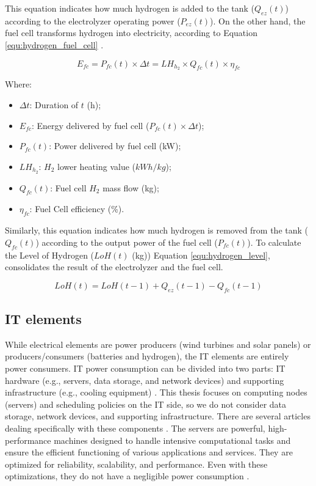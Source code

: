 This equation indicates how much hydrogen is added to the tank ($Q_{ez}(t)$) according to the electrolyzer operating power ($P_{ez}(t)$). On the other hand, the fuel cell transforms hydrogen into electricity, according to Equation \ref{equ:hydrogen_fuel_cell} \cite{haddad2019mixed}.

\begin{equation}
    \label{equ:hydrogen_fuel_cell}
    E_{fc} = P_{fc}(t) \times \Delta t = LH_{h_{2}} \times Q_{fc}(t) \times \eta_{fc}
\end{equation}

Where:
\begin{itemize}
    \item $\Delta t$: Duration of $t$ (h);
    \item $E_{fc}$: Energy delivered by fuel cell ($P_{fc}(t) \times \Delta t$);
    \item $P_{fc}(t)$: Power delivered by fuel cell (kW);
    \item $LH_{h_{2}}$: $H_2$ lower heating value ($kWh / kg$);
    \item $Q_{fc}(t)$: Fuel cell $H_2$ mass flow (kg);
    \item $\eta_{fc}$: Fuel Cell efficiency (\%).
\end{itemize}

Similarly, this equation indicates how much hydrogen is removed from the tank ($Q_{fc}(t)$) according to the output power of the fuel cell ($P_{fc}(t)$). To calculate the Level of Hydrogen ($LoH(t)$ (kg)) Equation \ref{equ:hydrogen_level}, consolidates the result of the electrolyzer and the fuel cell.

\begin{equation}
    \label{equ:hydrogen_level}
    LoH(t) = LoH(t-1) + Q_{ez}(t-1) - Q_{fc}(t-1)
\end{equation}

\subsection{IT elements}
\label{sec:related_work_it_elements}
While electrical elements are power producers (wind turbines and solar panels) or producers/consumers (batteries and hydrogen), the IT elements are entirely power consumers. IT power consumption can be divided into two parts: IT hardware (e.g., servers, data storage, and network devices) and supporting infrastructure (e.g., cooling equipment) \cite{centres2022data, dayarathna2015data}. This thesis focuses on computing nodes (servers) and scheduling policies on the IT side, so we do not consider data storage, network devices, and supporting infrastructure. There are several articles dealing specifically with these components \cite{dayarathna2015data, orgerie2014survey, zhang2021survey, hammadi2014survey, yuan2022optimal}. The servers are powerful, high-performance machines designed to handle intensive computational tasks and ensure the efficient functioning of various applications and services. They are optimized for reliability, scalability, and performance. Even with these optimizations, they do not have a negligible power consumption \cite{ismail2020computing, orgerie2014survey}.

